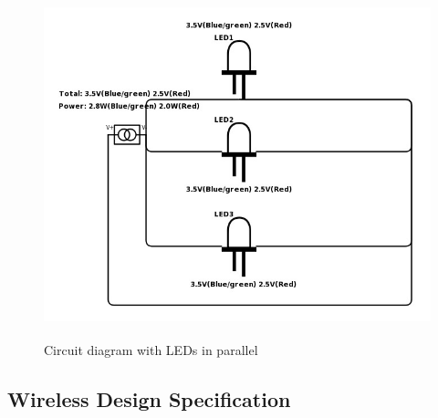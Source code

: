 \documentclass[12pt]{article}
\begin{document}
{{{{\begin{itemize}
\begin{itemize}
							\begin{figure}[!htb]
								\centering
								\includegraphics[height = 100mm]{assets/ParallelLED.jpg}
								\caption{Circuit diagram with LEDs in parallel \label{overflow}}
							\end{figure}
					\end{itemize}
			\end{itemize}
	\clearpage

	\subsection{Wireless Design Specification}
	
}}}}
\end{document}
